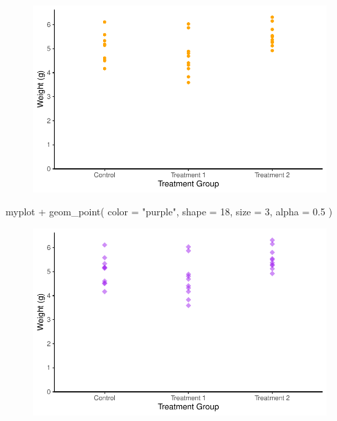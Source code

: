 \documentclass[
  letterpaper,
  DIV=11,
  numbers=noendperiod]{scrartcl}
\newenvironment{Shaded}{\begin{snugshade}}{\end{snugshade}}
\newcommand{\AttributeTok}[1]{\textcolor[rgb]{0.40,0.45,0.13}{#1}}
\newcommand{\DecValTok}[1]{\textcolor[rgb]{0.68,0.00,0.00}{#1}}
\newcommand{\FloatTok}[1]{\textcolor[rgb]{0.68,0.00,0.00}{#1}}
\newcommand{\FunctionTok}[1]{\textcolor[rgb]{0.28,0.35,0.67}{#1}}
\newcommand{\NormalTok}[1]{\textcolor[rgb]{0.00,0.23,0.31}{#1}}
\newcommand{\SpecialCharTok}[1]{\textcolor[rgb]{0.37,0.37,0.37}{#1}}
\newcommand{\StringTok}[1]{\textcolor[rgb]{0.13,0.47,0.30}{#1}}
\begin{document}
\begin{figure}[H]

{\centering \includegraphics{ggplot2intro_files/figure-pdf/unnamed-chunk-24-1.pdf}

}

\end{figure}

\begin{Shaded}
\begin{Highlighting}[]
\NormalTok{myplot }\SpecialCharTok{+}
  \FunctionTok{geom\_point}\NormalTok{(}
    \AttributeTok{color =} \StringTok{"purple"}\NormalTok{, }
    \AttributeTok{shape =} \DecValTok{18}\NormalTok{, }
    \AttributeTok{size =} \DecValTok{3}\NormalTok{, }
    \AttributeTok{alpha =} \FloatTok{0.5}
\NormalTok{  )}
\end{Highlighting}
\end{Shaded}

\begin{figure}[H]

{\centering \includegraphics{ggplot2intro_files/figure-pdf/unnamed-chunk-25-1.pdf}

}

\end{figure}
\end{document}
